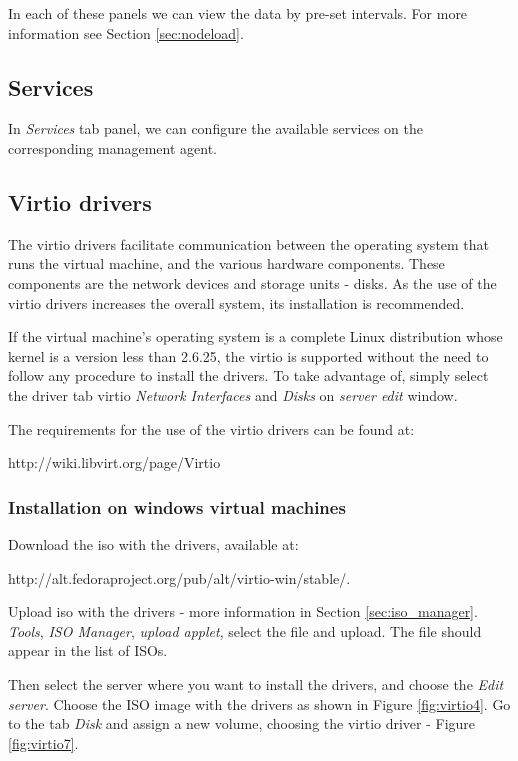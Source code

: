 In each of these panels we can view the data by pre-set intervals. For more information see Section \ref{sec:nodeload}.

\subsection{Services}
In \emph{Services} tab panel, we can configure the available services on the corresponding management agent.

\subsection{Virtio drivers}
The virtio drivers facilitate communication between the operating system that runs the virtual machine, and the various hardware components. These components are the network devices and storage units - disks. As the use of the virtio drivers increases the overall system, its installation is recommended.

If the virtual machine's operating system is a complete Linux distribution whose kernel is a version less than 2.6.25, the virtio is supported without the need to follow any procedure to install the drivers. To take advantage of, simply select the driver tab virtio \textit{Network Interfaces} and \textit{Disks} on \textit{server edit} window.

The requirements for the use of the virtio drivers can be found at:

http://wiki.libvirt.org/page/Virtio

\subsubsection*{Installation on windows virtual machines}

Download the iso with the drivers, available at:

http://alt.fedoraproject.org/pub/alt/virtio-win/stable/.

Upload iso with the drivers - more information in Section \ref{sec:iso_manager}. \textit{Tools}, \textit{ISO Manager}, \textit{upload applet}, select the file and upload. The file should appear in the list of ISOs.

Then select the server where you want to install the drivers, and choose the \textit{Edit server}. Choose the ISO image with the drivers as shown in Figure \ref{fig:virtio4}. Go to the tab \textit{Disk} and assign a new volume, choosing the virtio driver - Figure \ref{fig:virtio7}.

